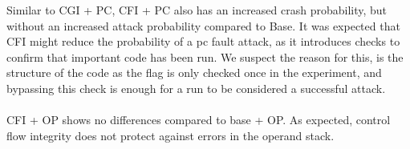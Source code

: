 Similar to CGI + PC, CFI + PC also has an increased crash probability, but without an increased attack probability compared to Base. 
It was expected that CFI might reduce the probability of a pc fault attack, as it introduces checks to confirm that important code has been run. We suspect the reason for this, is the structure of the code as the flag is only checked once in the experiment, and bypassing this check is enough for a run to be considered a successful attack.\\\\
CFI + OP shows no differences compared to base + OP. As expected, control flow integrity does not protect against errors in the operand stack. 